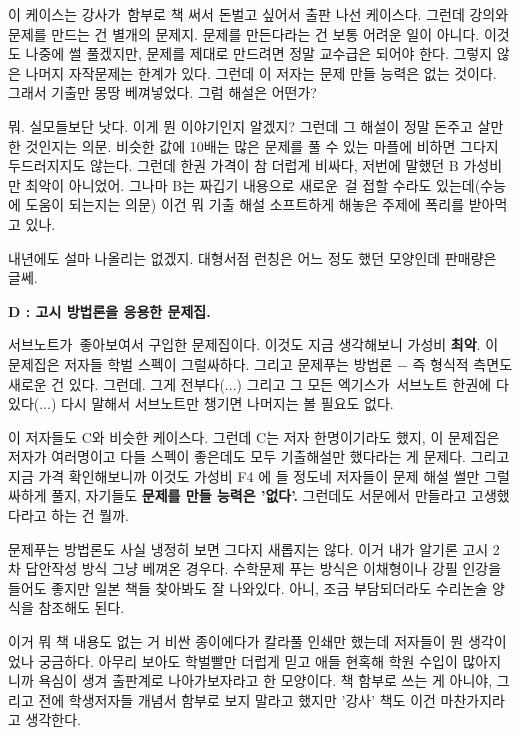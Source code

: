 이 케이스는 강사가 함부로 책 써서 돈벌고 싶어서 출판 나선 케이스다.
그런데 강의와 문제를 만드는 건 별개의 문제지. 문제를 만든다라는 건 보통 어려운 일이 아니다.
이것도 나중에 썰 풀겠지만, 문제를 제대로 만드려면 정말 교수급은 되어야 한다. 그렇지 않은 나머지 자작문제는 한계가 있다.
그런데 이 저자는 문제 만들 능력은 없는 것이다. 그래서 기출만 몽땅 베껴넣었다.
그럼 해설은 어떤가?
\vspace{5mm}

뭐. 실모들보단 낫다. 이게 뭔 이야기인지 알겠지? 그런데 그 해설이 정말 돈주고 살만한 것인지는 의문.
비슷한 값에 10배는 많은 문제를 풀 수 있는 마플에 비하면 그다지 두드러지지도 않는다.
그런데 한권 가격이 참 더럽게 비싸다, 저번에 말했던 B 가성비만 최악이 아니었어.
그나마 B는 짜깁기 내용으로 새로운 걸 접할 수라도 있는데(수능에 도움이 되는지는 의문)
이건 뭐 기출 해설 소프트하게 해놓은 주제에 폭리를 받아먹고 있나.
\vspace{5mm}

내년에도 설마 나올리는 없겠지. 대형서점 런칭은 어느 정도 했던 모양인데 판매량은 글쎄.
\vspace{5mm}

\textbf{D : 고시 방법론을 응용한 문제집.}
\vspace{5mm}

서브노트가 좋아보여서 구입한 문제집이다. 이것도 지금 생각해보니 가성비 \textbf{최악}.
이 문제집은 저자들 학벌 스펙이 그럴싸하다. 그리고 문제푸는 방법론 $-$ 즉 형식적 측면도 새로운 건 있다.
그런데. 그게 전부다(...) 그리고 그 모든 엑기스가 서브노트 한권에 다 있다(...)
다시 말해서 서브노트만 챙기면 나머지는 볼 필요도 없다.
\vspace{5mm}

이 저자들도 C와 비슷한 케이스다. 그런데 C는 저자 한명이기라도 했지, 이 문제집은 저자가 여러명이고 다들 스펙이 좋은데도
모두 기출해설만 했다라는 게 문제다. 그리고 지금 가격 확인해보니까 이것도 가성비 F4 에 들 정도네
저자들이 문제 해설 썰만 그럴싸하게 풀지, 자기들도 \textbf{문제를 만들 능력은 '없다'.}
그런데도 서문에서 만들라고 고생했다라고 하는 건 뭘까.
\vspace{5mm}

문제푸는 방법론도 사실 냉정히 보면 그다지 새롭지는 않다. 이거 내가 알기론 고시 2차 답안작성 방식 그냥 베껴온 경우다.
수학문제 푸는 방식은 이채형이나 강필 인강을 들어도 좋지만 일본 책들 찾아봐도 잘 나와있다.
아니, 조금 부담되더라도 수리논술 양식을 참조해도 된다.
\vspace{5mm}

이거 뭐 책 내용도 없는 거 비싼 종이에다가 칼라풀 인쇄만 했는데 저자들이 뭔 생각이었나 궁금하다.
아무리 보아도 학벌빨만 더럽게 믿고 애들 현혹해 학원 수입이 많아지니까 욕심이 생겨 출판계로 나아가보자라고 한 모양이다.
책 함부로 쓰는 게 아니야, 그리고 전에 학생저자들 개념서 함부로 보지 말라고 했지만 '강사' 책도 이건 마찬가지라고 생각한다.
\vspace{5mm}

